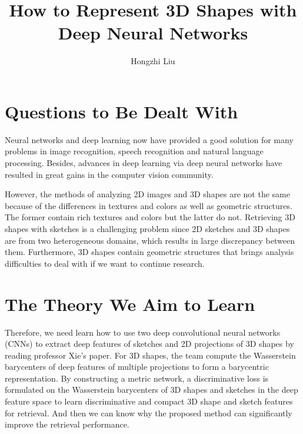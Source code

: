 \documentclass{article}
\author{Hongzhi Liu}
\title{How to Represent 3D Shapes with Deep Neural Networks}
\begin{document}
\maketitle
  \par
  \section{Questions to Be Dealt With}
  Neural networks and deep learning now have provided a good solution for many problems in image recognition, speech recognition and natural language processing. Besides, advances in deep learning via deep neural networks have resulted in great gains in the computer vision community.

  However, the methods of analyzing 2D images and 3D shapes are not the same because of the differences in textures and colors as well as geometric structures. The former contain rich textures and colors but the latter do not. Retrieving 3D shapes with sketches is a challenging problem since 2D sketches and 3D shapes are from two heterogeneous domains, which results in large discrepancy between them. Furthermore, 3D shapes contain geometric structures that brings analysis difficulties to deal with if we want to continue research.

\section{The Theory We Aim to Learn}

  Therefore, we need learn how to use two deep convolutional neural networks (CNNs) to extract deep features of sketches and 2D projections of 3D shapes by reading professor Xie's paper. For 3D shapes, the team compute the Wasserstein barycenters of deep features of multiple projections to form a barycentric representation. By constructing a metric network, a discriminative loss is formulated on the Wasserstein barycenters of 3D shapes and sketches in the deep feature space to learn discriminative and compact 3D shape and sketch features for retrieval. And then we can know why the proposed method can significantly improve the retrieval performance.
\end{document}
